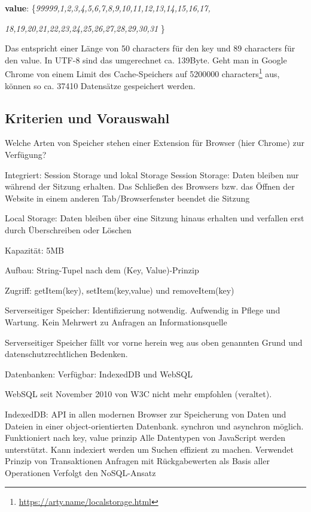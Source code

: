 \textbf{value}: \big\{\textit{99999,1,2,3,4,5,6,7,8,9,10,11,12,13,14,15,16,17,}
	
\textit{18,19,20,21,22,23,24,25,26,27,28,29,30,31} \big\}

Das entspricht einer Länge von 50 characters für den key und 89 characters für den value. In UTF-8 sind das umgerechnet ca. 139Byte. Geht man in Google Chrome von einem Limit des Cache-Speichers auf 5200000 characters\footnote{\url{https://arty.name/localstorage.html}} aus, können so ca. 37410 Datensätze gespeichert werden.

\subsection{Kriterien und Vorauswahl}
\label{vorauswahl}


Welche Arten von Speicher stehen einer Extension für Browser (hier Chrome) zur Verfügung?

Integriert: Session Storage und lokal Storage
Session Storage: Daten bleiben nur während der Sitzung erhalten. Das Schließen des Browsers bzw. das Öffnen der Website in einem anderen Tab/Browserfenster beendet die Sitzung

Local Storage: Daten bleiben über eine Sitzung hinaus erhalten und verfallen erst durch Überschreiben oder Löschen

Kapazität: 5MB

Aufbau: String-Tupel nach dem (Key, Value)-Prinzip

Zugriff: getItem(key), setItem(key,value) und removeItem(key)


Serverseitiger Speicher:
Identifizierung notwendig. Aufwendig in Pflege und Wartung. Kein Mehrwert zu Anfragen an Informationsquelle

Serverseitiger Speicher fällt vor vorne herein weg aus oben genannten Grund und datenschutzrechtlichen Bedenken.


Datenbanken:
Verfügbar: IndexedDB und WebSQL

WebSQL seit November 2010 von W3C nicht mehr empfohlen (veraltet).

IndexedDB: API in allen modernen Browser zur Speicherung von Daten und Dateien in einer object-orientierten Datenbank.
synchron und asynchron möglich.
Funktioniert nach key, value prinzip
Alle Datentypen von JavaScript werden unterstützt.
Kann indexiert werden um Suchen effizient zu machen.
Verwendet Prinzip von Transaktionen
Anfragen mit Rückgabewerten als Basis aller Operationen
Verfolgt den NoSQL-Ansatz


